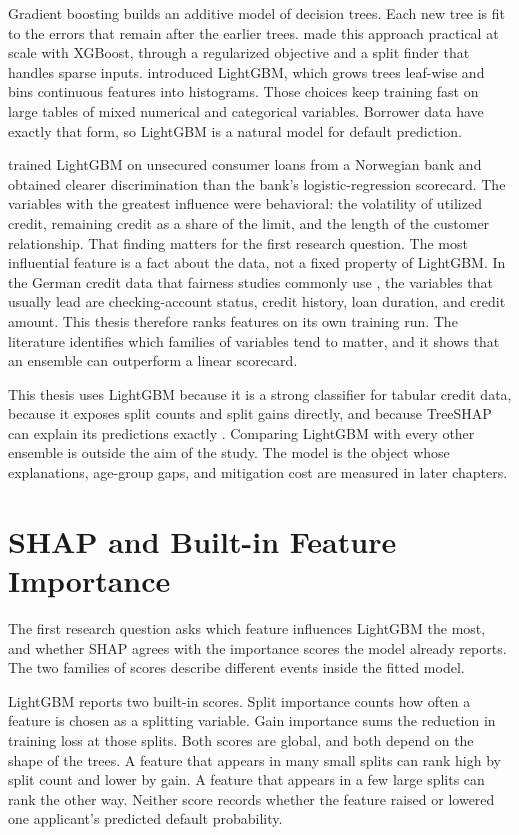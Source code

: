 Gradient boosting builds an additive model of decision trees. Each new tree is fit to the errors that remain after the earlier trees. \citet{chen2016xgboost} made this approach practical at scale with XGBoost, through a regularized objective and a split finder that handles sparse inputs. \citet{ke2017lightgbm} introduced LightGBM, which grows trees leaf-wise and bins continuous features into histograms. Those choices keep training fast on large tables of mixed numerical and categorical variables. Borrower data have exactly that form, so LightGBM is a natural model for default prediction.

\citet{delange2022xai} trained LightGBM on unsecured consumer loans from a Norwegian bank and obtained clearer discrimination than the bank's logistic-regression scorecard. The variables with the greatest influence were behavioral: the volatility of utilized credit, remaining credit as a share of the limit, and the length of the customer relationship. That finding matters for the first research question. The most influential feature is a fact about the data, not a fixed property of LightGBM. In the German credit data that fairness studies commonly use \citep{hofmann1994german}, the variables that usually lead are checking-account status, credit history, loan duration, and credit amount. This thesis therefore ranks features on its own training run. The literature identifies which families of variables tend to matter, and it shows that an ensemble can outperform a linear scorecard.

This thesis uses LightGBM because it is a strong classifier for tabular credit data, because it exposes split counts and split gains directly, and because TreeSHAP can explain its predictions exactly \citep{lundberg2020treeshap}. Comparing LightGBM with every other ensemble is outside the aim of the study. The model is the object whose explanations, age-group gaps, and mitigation cost are measured in later chapters.

\section{SHAP and Built-in Feature Importance}
\label{sec:related-explain}

The first research question asks which feature influences LightGBM the most, and whether SHAP agrees with the importance scores the model already reports. The two families of scores describe different events inside the fitted model.

LightGBM reports two built-in scores. Split importance counts how often a feature is chosen as a splitting variable. Gain importance sums the reduction in training loss at those splits. Both scores are global, and both depend on the shape of the trees. A feature that appears in many small splits can rank high by split count and lower by gain. A feature that appears in a few large splits can rank the other way. Neither score records whether the feature raised or lowered one applicant's predicted default probability.

